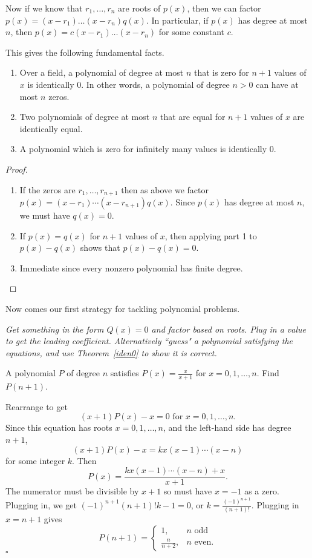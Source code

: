 Now if we know that $r_1,\ldots, r_n$ are roots of $p(x)$, then we can factor $p(x)=(x-r_1)\ldots(x-r_n)q(x)$. In particular, if $p(x)$ has degree at most $n$, then $p(x)=c(x-r_1)\ldots (x-r_n)$ for some constant $c$.

This gives the following fundamental facts.
\begin{thm}\label{iden0}
\begin{enumerate}
\item Over a field, a polynomial of degree at most $n$ that is zero for $n+1$ values of $x$ is identically 0. In other words, a polynomial of degree $n>0$ can have at most $n$ zeros.
\item Two polynomials of degree at most $n$ that are equal for $n+1$ values of $x$ are identically equal.
\item A polynomial which is zero for infinitely many values is identically 0.
\end{enumerate}
\end{thm}
\begin{proof}
\begin{enumerate}
\item If the zeros are $r_1,\ldots, r_{n+1}$ then as above we factor $p(x)=(x-r_1)\cdots (x-r_{n+1})q(x)$. Since $p(x)$ has degree at most $n$, we must have $q(x)=0$.

\item If $p(x)=q(x)$ for $n+1$ values of $x$, then applying part 1 to $p(x)-q(x)$ shows that $p(x)-q(x)=0$.

\item Immediate since every nonzero polynomial has finite degree.
\end{enumerate}
\end{proof}

Now comes our first strategy for tackling polynomial problems.

{\it Get something in the form $Q(x)=0$ and factor based on roots. Plug in a value to get the leading coefficient. Alternatively ``guess" a polynomial satisfying the equations, and use Theorem~\ref{iden0} to show it is correct.}

\begin{ex}
A polynomial $P$ of degree $n$ satisfies $P(x)=\frac{x}{x+1}$ for $x=0,1,\ldots ,n$. Find $P(n+1)$.
\end{ex}
 Rearrange to get
\[(x+1)P(x)-x=0\text{ for }x=0,1,\ldots, n.\]
Since this equation has roots $x=0,1,\ldots, n$, and the left-hand side has degree $n+1$, 
\[(x+1)P(x)-x=kx(x-1)\cdots (x-n)\]
for some integer $k$. Then
\[P(x)=\frac{kx(x-1)\cdots (x-n)+x}{x+1}.\]
The numerator must be divisible by $x+1$ so must have $x=-1$ as a zero. Plugging in, we get $(-1)^{n+1}(n+1)!k-1=0$, or $k=\frac{(-1)^{n+1}}{(n+1)!}$. Plugging in $x=n+1$ gives
\[P(n+1)=\begin{cases}1,&n\text{ odd}\\ \frac{n}{n+2},&n\text { even.}\end{cases}\]
 $\square$ \\

